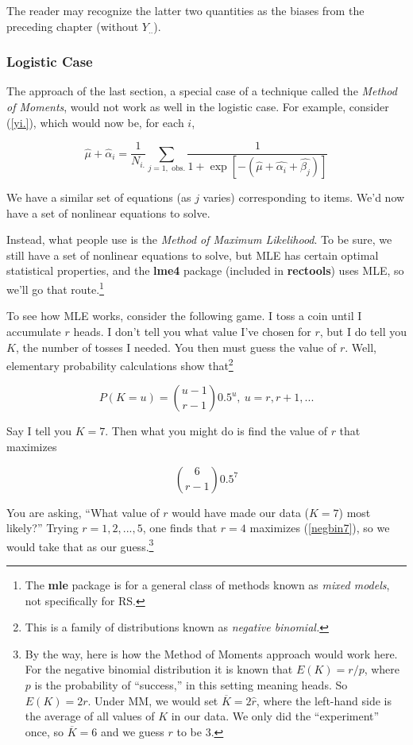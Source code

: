 The reader may recognize the latter two quantities as the biases from
the preceding chapter (without $Y_{..}$).

\subsubsection{Logistic Case}

The approach of the last section, a special case of a technique called
the \textit{Method of Moments}, would not work as well in the logistic
case.  For example, consider (\ref{yi.}), which would now be, for each
$i$,

\begin{equation}
\label{nonlin1}
\widehat{\mu} + \widehat{\alpha}_i = 
\frac{1}{N_{i.}} \sum_{j=1, \textrm{ obs.}}
\frac{1}{1 + \exp[-(\widehat{\mu} + \widehat{\alpha_i} + \widehat{\beta_j})]}
\end{equation}

We have a similar set of equations (as $j$ varies) corresponding to
items.  We'd now have a set of nonlinear equations to solve.

Instead, what people use is the \textit{Method of Maximum Likelihood}.
To be sure, we still have a set of nonlinear equations to solve, but MLE
has certain optimal statistical properties, and the \textbf{lme4}
package (included in \textbf{rectools}) uses MLE, so we'll go that
route.\footnote{The \textbf{mle} package is for a general class of
methods known as \textit{mixed models}, not specifically for RS.}

To see how MLE works, consider the following game.  I toss a coin until
I accumulate $r$ heads.  I don't tell you what value I've chosen for
$r$, but I do tell you $K$, the number of tosses I needed.  You then
must guess the value of $r$.  Well, elementary probability calculations 
show that\footnote{This is a family of distributions known as
\textit{negative binomial.}}

\begin{equation}
\label{negbin}
P(K = u) = \binom{u-1}{r-1} 0.5^u,~ u = r, r+1, ...
\end{equation}

Say I tell you $K = 7$.  Then what you might do is find the value of $r$
that maximizes 

\begin{equation}
\label{negbin7}
\binom{6}{r-1} 0.5^7
\end{equation}

You are asking, ``What value of $r$ would have made our data ($K = 7$)
most likely?''  Trying $r = 1,2,...,5$, one finds that $r = 4$ maximizes
(\ref{negbin7}), so we would take that as our guess.\footnote{By the
way, here is how the Method of Moments approach would work here. For the
negative binomial distribution it is known that $E(K) = r/p$, where $p$
is the probability of ``success,'' in this setting meaning heads.  So
$E(K) = 2r$.  Under MM, we would set $\overline{K} = 2 \widehat{r}$,
where the left-hand side is the average of all values of $K$ in our
data.  We only did the ``experiment'' once, so $\overline{K} = 6$ and we
guess $r$ to be 3.}

